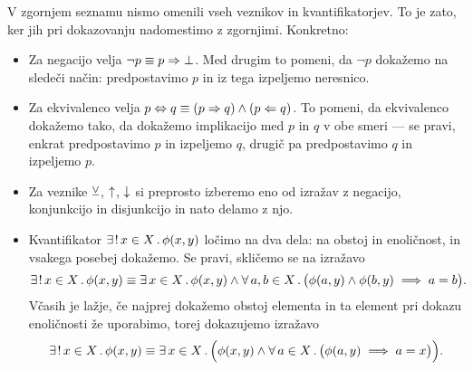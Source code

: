         V zgornjem seznamu nismo omenili vseh veznikov in kvantifikatorjev. To je zato, ker jih pri dokazovanju nadomestimo z zgornjimi. Konkretno:
        \begin{itemize}
                \item
                        Za negacijo velja $\lnot{p} \equiv p \Rightarrow \bot$. Med drugim to pomeni, da $\lnot{p}$ dokažemo na sledeči način: predpostavimo $p$ in iz tega izpeljemo neresnico.
                \item
                        Za ekvivalenco velja $p \Leftrightarrow q \equiv (p \Rightarrow q) \land (p \Leftarrow q)$. To pomeni, da ekvivalenco dokažemo tako, da dokažemo implikacijo med $p$ in $q$ v obe smeri --- se pravi, enkrat predpostavimo $p$ in izpeljemo $q$, drugič pa predpostavimo $q$ in izpeljemo $p$.
                \item
                        Za veznike $\mathbin{\veebar}$, $\mathbin{\uparrow}$, $\mathbin{\downarrow}$ si preprosto izberemo eno od izražav z negacijo, konjunkcijo in disjunkcijo in nato delamo z njo.
                \item
                        Kvantifikator $\xexactlyone{x}[X]{\phi(x, y)}$ ločimo na dva dela: na obstoj in enoličnost, in vsakega posebej dokažemo. Se pravi, skličemo se na izražavo
                        \[\xexactlyone{x}[X]{\phi(x, y)} \equiv \xsome{x}[X]{\phi(x, y)} \land \all[1]{a, b}[X]{\phi(a, y) \land \phi(b, y) \implies a = b}.\]
                        Včasih je lažje, če najprej dokažemo obstoj elementa in ta element pri dokazu enoličnosti že uporabimo, torej dokazujemo izražavo
                        \[\xexactlyone{x}[X]{\phi(x, y)} \equiv \some[2]{x}[X]{\phi(x, y) \land \all[1]{a}[X]{\phi(a, y) \implies a = x}}.\]
        \end{itemize}

